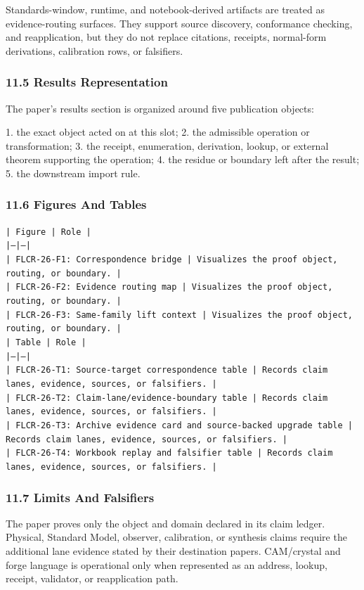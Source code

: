 \documentclass[11pt]{article}
\begin{document}
Standards-window, runtime, and notebook-derived artifacts are treated
as evidence-routing surfaces. They support source discovery, conformance
checking, and reapplication, but they do not replace citations, receipts,
normal-form derivations, calibration rows, or falsifiers.

\subsubsection*{11.5 Results Representation}

The paper's results section is organized around five publication objects:

1. the exact object acted on at this slot;
2. the admissible operation or transformation;
3. the receipt, enumeration, derivation, lookup, or external theorem supporting
   the operation;
4. the residue or boundary left after the result;
5. the downstream import rule.

\subsubsection*{11.6 Figures And Tables}

\noindent\texttt{| Figure | Role |}\\
\noindent\texttt{|---|---|}\\
\noindent\texttt{| FLCR-26-F1: Correspondence bridge | Visualizes the proof object, routing, or boundary. |}\\
\noindent\texttt{| FLCR-26-F2: Evidence routing map | Visualizes the proof object, routing, or boundary. |}\\
\noindent\texttt{| FLCR-26-F3: Same-family lift context | Visualizes the proof object, routing, or boundary. |}\\

\noindent\texttt{| Table | Role |}\\
\noindent\texttt{|---|---|}\\
\noindent\texttt{| FLCR-26-T1: Source-target correspondence table | Records claim lanes, evidence, sources, or falsifiers. |}\\
\noindent\texttt{| FLCR-26-T2: Claim-lane/evidence-boundary table | Records claim lanes, evidence, sources, or falsifiers. |}\\
\noindent\texttt{| FLCR-26-T3: Archive evidence card and source-backed upgrade table | Records claim lanes, evidence, sources, or falsifiers. |}\\
\noindent\texttt{| FLCR-26-T4: Workbook replay and falsifier table | Records claim lanes, evidence, sources, or falsifiers. |}\\

\subsubsection*{11.7 Limits And Falsifiers}

The paper proves only the object and domain declared in its claim ledger.
Physical, Standard Model, observer, calibration, or synthesis claims require
the additional lane evidence stated by their destination papers. CAM/crystal
and forge language is operational only when represented as an address, lookup,
receipt, validator, or reapplication path.
\end{document}
